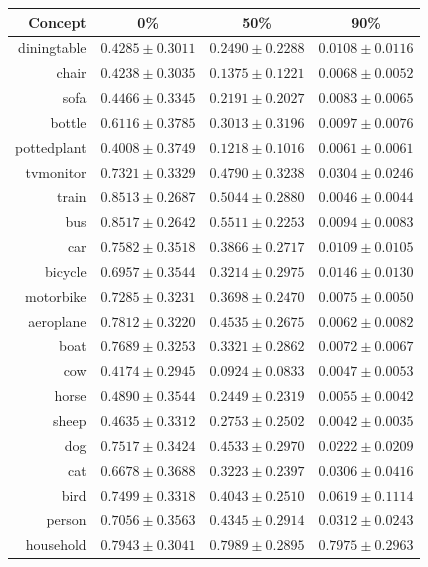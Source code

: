 \documentclass[11pt,a4paper]{article}
\begin{document}
\begin{table}[htbp]
\centering
\begin{tabular}{r|c|c|c}
Concept & 0\% & 50\% & 90\%\\\hline
diningtable   & $0.4285\pm0.3011$ & $0.2490\pm0.2288$ & $0.0108\pm0.0116$\\
chair         & $0.4238\pm0.3035$ & $0.1375\pm0.1221$ & $0.0068\pm0.0052$\\
sofa          & $0.4466\pm0.3345$ & $0.2191\pm0.2027$ & $0.0083\pm0.0065$\\
bottle        & $0.6116\pm0.3785$ & $0.3013\pm0.3196$ & $0.0097\pm0.0076$\\
pottedplant   & $0.4008\pm0.3749$ & $0.1218\pm0.1016$ & $0.0061\pm0.0061$\\
tvmonitor     & $0.7321\pm0.3329$ & $0.4790\pm0.3238$ & $0.0304\pm0.0246$\\
train         & $0.8513\pm0.2687$ & $0.5044\pm0.2880$ & $0.0046\pm0.0044$\\
bus           & $0.8517\pm0.2642$ & $0.5511\pm0.2253$ & $0.0094\pm0.0083$\\
car           & $0.7582\pm0.3518$ & $0.3866\pm0.2717$ & $0.0109\pm0.0105$\\
bicycle       & $0.6957\pm0.3544$ & $0.3214\pm0.2975$ & $0.0146\pm0.0130$\\
motorbike     & $0.7285\pm0.3231$ & $0.3698\pm0.2470$ & $0.0075\pm0.0050$\\
aeroplane     & $0.7812\pm0.3220$ & $0.4535\pm0.2675$ & $0.0062\pm0.0082$\\
boat          & $0.7689\pm0.3253$ & $0.3321\pm0.2862$ & $0.0072\pm0.0067$\\
cow           & $0.4174\pm0.2945$ & $0.0924\pm0.0833$ & $0.0047\pm0.0053$\\
horse         & $0.4890\pm0.3544$ & $0.2449\pm0.2319$ & $0.0055\pm0.0042$\\
sheep         & $0.4635\pm0.3312$ & $0.2753\pm0.2502$ & $0.0042\pm0.0035$\\
dog           & $0.7517\pm0.3424$ & $0.4533\pm0.2970$ & $0.0222\pm0.0209$\\
cat           & $0.6678\pm0.3688$ & $0.3223\pm0.2397$ & $0.0306\pm0.0416$\\
bird          & $0.7499\pm0.3318$ & $0.4043\pm0.2510$ & $0.0619\pm0.1114$\\
person        & $0.7056\pm0.3563$ & $0.4345\pm0.2914$ & $0.0312\pm0.0243$\\\hline
household     & $0.7943\pm0.3041$ & $0.7989\pm0.2895$ & $0.7975\pm0.2963$\\

\end{tabular}
\end{table}
\end{document}
